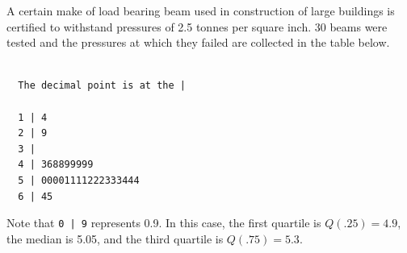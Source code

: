 \documentclass[addpoints]{examsetup}\usepackage[]{graphicx}\usepackage[]{color}
\makeatletter
\newenvironment{kframe}{%
 \def\at@end@of@kframe{}%
 \ifinner\ifhmode%
  \def\at@end@of@kframe{\end{minipage}}%
  \begin{minipage}{\columnwidth}%
 \fi\fi%
 \def\FrameCommand##1{\hskip\@totalleftmargin \hskip-\fboxsep
 \colorbox{shadecolor}{##1}\hskip-\fboxsep
     \hskip-\linewidth \hskip-\@totalleftmargin \hskip\columnwidth}%
 \MakeFramed {\advance\hsize-\width
   \@totalleftmargin\z@ \linewidth\hsize
   \@setminipage}}%
 {\par\unskip\endMakeFramed%
 \at@end@of@kframe}
\newenvironment{knitrout}{}{} %
\makeatother
\begin{document}
\begin{questions}
\question 



A certain make of load bearing beam used in construction of large buildings is certified to withstand pressures of 2.5 tonnes per square inch.
30 beams were tested and the pressures at which they failed are collected in the table below.

\begin{knitrout}
\color{fgcolor}\begin{kframe}
\begin{verbatim}

  The decimal point is at the |

  1 | 4
  2 | 9
  3 | 
  4 | 368899999
  5 | 00001111222333444
  6 | 45
\end{verbatim}
\end{kframe}
\end{knitrout}

Note that \verb!0 | 9! represents 0.9. In this case, the first quartile is $Q(.25) = 4.9$, 
the median is 5.05, and the third quartile is $Q(.75) = 5.3$.

\end{questions}
\end{document}
